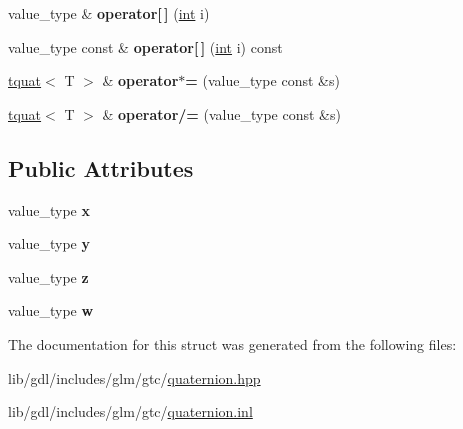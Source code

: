 \begin{DoxyCompactItemize}
\item 
\hypertarget{structglm_1_1detail_1_1tquat_a5d1e6b060936b49027498e6d53c76376}{}value\+\_\+type \& {\bfseries operator\mbox{[}$\,$\mbox{]}} (\hyperlink{_s_d_l__thread_8h_a6a64f9be4433e4de6e2f2f548cf3c08e}{int} i)\label{structglm_1_1detail_1_1tquat_a5d1e6b060936b49027498e6d53c76376}

\item 
\hypertarget{structglm_1_1detail_1_1tquat_a6c3cfd12f4181c6a333ef9f9e34b17cb}{}value\+\_\+type const \& {\bfseries operator\mbox{[}$\,$\mbox{]}} (\hyperlink{_s_d_l__thread_8h_a6a64f9be4433e4de6e2f2f548cf3c08e}{int} i) const \label{structglm_1_1detail_1_1tquat_a6c3cfd12f4181c6a333ef9f9e34b17cb}

\item 
\hypertarget{structglm_1_1detail_1_1tquat_af11533bae22ffefb3e2c676d2dafec39}{}\hyperlink{structglm_1_1detail_1_1tquat}{tquat}$<$ T $>$ \& {\bfseries operator$\ast$=} (value\+\_\+type const \&s)\label{structglm_1_1detail_1_1tquat_af11533bae22ffefb3e2c676d2dafec39}

\item 
\hypertarget{structglm_1_1detail_1_1tquat_a1c5c04b2dd3b4a7e320b92ff19e0a1de}{}\hyperlink{structglm_1_1detail_1_1tquat}{tquat}$<$ T $>$ \& {\bfseries operator/=} (value\+\_\+type const \&s)\label{structglm_1_1detail_1_1tquat_a1c5c04b2dd3b4a7e320b92ff19e0a1de}

\end{DoxyCompactItemize}
\subsection*{Public Attributes}
\begin{DoxyCompactItemize}
\item 
\hypertarget{structglm_1_1detail_1_1tquat_a7f897684c4c180018a4f01ceaa4f775a}{}value\+\_\+type {\bfseries x}\label{structglm_1_1detail_1_1tquat_a7f897684c4c180018a4f01ceaa4f775a}

\item 
\hypertarget{structglm_1_1detail_1_1tquat_aa79431da9a3822fee4155a4b080c1d0a}{}value\+\_\+type {\bfseries y}\label{structglm_1_1detail_1_1tquat_aa79431da9a3822fee4155a4b080c1d0a}

\item 
\hypertarget{structglm_1_1detail_1_1tquat_aaeb15cd65ede32625a579699798cf77c}{}value\+\_\+type {\bfseries z}\label{structglm_1_1detail_1_1tquat_aaeb15cd65ede32625a579699798cf77c}

\item 
\hypertarget{structglm_1_1detail_1_1tquat_abe11665751ce8cbeae672b187a95e570}{}value\+\_\+type {\bfseries w}\label{structglm_1_1detail_1_1tquat_abe11665751ce8cbeae672b187a95e570}

\end{DoxyCompactItemize}


The documentation for this struct was generated from the following files\+:\begin{DoxyCompactItemize}
\item 
lib/gdl/includes/glm/gtc/\hyperlink{gtc_2quaternion_8hpp}{quaternion.\+hpp}\item 
lib/gdl/includes/glm/gtc/\hyperlink{gtc_2quaternion_8inl}{quaternion.\+inl}\end{DoxyCompactItemize}
